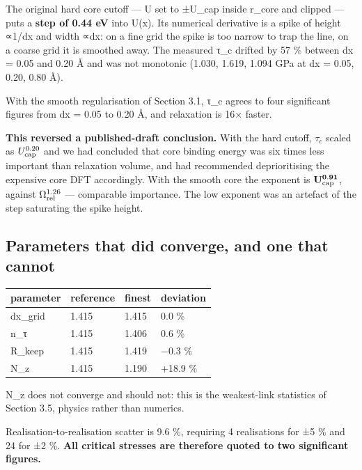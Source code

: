 The original hard core cutoff --- U set to ±U\_cap inside r\_core and clipped --- puts a \textbf{step of 0.44 eV} into U(x). Its numerical derivative is a spike of height ∝1/dx and width ∝dx: on a fine grid the spike is too narrow to trap the line, on a coarse grid it is smoothed away. The measured τ\_c drifted by 57 \% between dx = 0.05 and 0.20 Å and was not monotonic (1.030, 1.619, 1.094 GPa at dx = 0.05, 0.20, 0.80 Å).

With the smooth regularisation of Section 3.1, τ\_c agrees to four significant figures from dx = 0.05 to 0.20 Å, and relaxation is 16× faster.

\textbf{This reversed a published-draft conclusion.} With the hard cutoff, \(\tau_c\) scaled as \(U_{\rm cap}^{0.20}\) and we had concluded that core binding energy was six times less important than relaxation volume, and had recommended deprioritising the expensive core DFT accordingly. With the smooth core the exponent is \(\mathbf{U_{\rm cap}^{0.91}}\), against \(\Omega_{\rm rel}^{1.26}\) --- comparable importance. The low exponent was an artefact of the step saturating the spike height.

\hypertarget{parameters-that-did-converge-and-one-that-cannot}{%
\subsection{Parameters that did converge, and one that cannot}\label{sec:parameters-that-did-converge-and-one-that-cannot}}

\begin{longtable}[]{@{}llll@{}}
\toprule\noalign{}
parameter & reference & finest & deviation \\
\midrule\noalign{}
\endhead
\bottomrule\noalign{}
\endlastfoot
dx\_grid & 1.415 & 1.415 & 0.0 \% \\
n\_τ & 1.415 & 1.406 & 0.6 \% \\
R\_keep & 1.415 & 1.419 & −0.3 \% \\
N\_z & 1.415 & 1.190 & +18.9 \% \\
\end{longtable}

N\_z does not converge and should not: this is the weakest-link statistics of Section 3.5, physics rather than numerics.

Realisation-to-realisation scatter is 9.6 \%, requiring 4 realisations for ±5 \% and 24 for ±2 \%. \textbf{All critical stresses are therefore quoted to two significant figures.}

